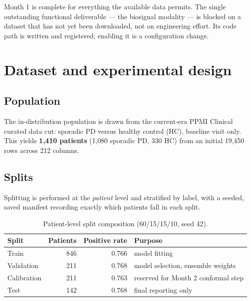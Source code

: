 \documentclass[11pt,a4paper]{article}
\begin{document}
\noindent
Month 1 is complete for everything the available data permits. The single
outstanding functional deliverable --- the biosignal modality --- is blocked on
a dataset that has not yet been downloaded, not on engineering effort. Its code
path is written and registered; enabling it is a configuration change.

\section{Dataset and experimental design}

\subsection{Population}

The in-distribution population is drawn from the current-era PPMI Clinical
curated data cut: sporadic PD versus healthy control (HC), baseline visit only.
This yields \textbf{1{,}410 patients} (1{,}080 sporadic PD, 330 HC) from an
initial 19{,}450 rows across 212 columns.

\subsection{Splits}

Splitting is performed at the \emph{patient} level and stratified by label, with
a seeded, saved manifest recording exactly which patients fall in each split.

\begin{table}[h]
\centering
\begin{tabular}{@{}lrrl@{}}
\toprule
\textbf{Split} & \textbf{Patients} & \textbf{Positive rate} & \textbf{Purpose} \\
\midrule
Train        & 846 & 0.766 & model fitting \\
Validation   & 211 & 0.768 & model selection, ensemble weights \\
Calibration  & 211 & 0.763 & reserved for Month 2 conformal step \\
Test         & 142 & 0.768 & final reporting only \\
\bottomrule
\end{tabular}
\caption{Patient-level split composition (60/15/15/10, seed 42).}
\label{tab:splits}
\end{table}
\end{document}
